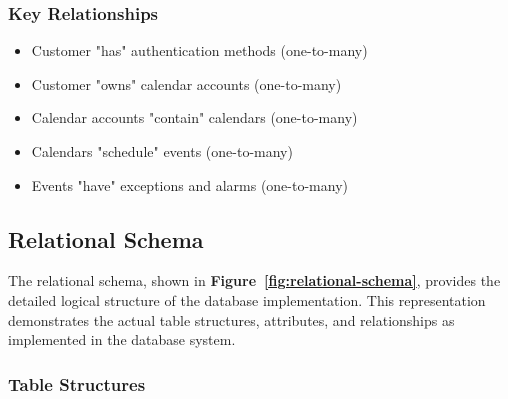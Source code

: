 \documentclass[12pt,a4paper]{report}
\begin{document}
\subsubsection{Key Relationships}

\begin{itemize}
    \item Customer "has" authentication methods (one-to-many)
    \item Customer "owns" calendar accounts (one-to-many)
    \item Calendar accounts "contain" calendars (one-to-many)
    \item Calendars "schedule" events (one-to-many)
    \item Events "have" exceptions and alarms (one-to-many)
\end{itemize}

\subsection{Relational Schema}

The relational schema, shown in \textbf{Figure~\ref{fig:relational-schema}}, provides the detailed logical structure of the database implementation. This representation demonstrates the actual table structures, attributes, and relationships as implemented in the database system.

\subsubsection{Table Structures}
\end{document}
